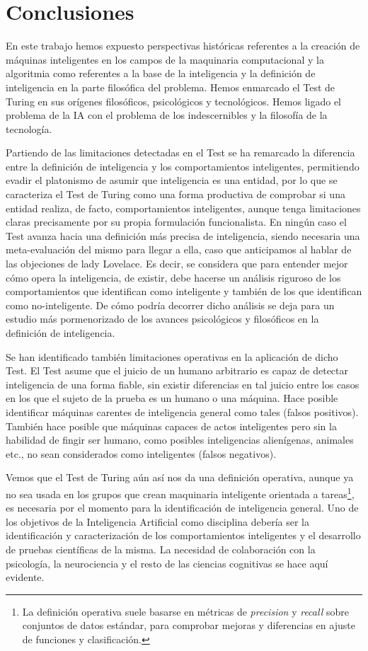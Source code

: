 \documentclass[12pt]{memoir}
\begin{document}
\chapter{Conclusiones}

En este trabajo hemos expuesto perspectivas históricas referentes a la creación de máquinas inteligentes en los campos de la maquinaria computacional y la algoritmia como referentes a la base de la inteligencia y la definición de inteligencia en la parte filosófica del problema. Hemos enmarcado el Test de Turing en sus orígenes filosóficos, psicológicos y tecnológicos. Hemos ligado el problema de la IA con el problema de los indescernibles y la filosofía de la tecnología.

Partiendo de las limitaciones detectadas en el Test se ha remarcado la diferencia entre la definición de inteligencia y los comportamientos inteligentes, permitiendo evadir el platonismo de asumir que inteligencia es una entidad, por lo que se caracteriza el Test de Turing como una forma productiva de comprobar si una entidad realiza, de facto, comportamientos inteligentes, aunque tenga limitaciones claras precisamente por su propia formulación funcionalista. En ningún caso el Test avanza hacia una definición más precisa de inteligencia, siendo necesaria una meta-evaluación del mismo para llegar a ella, caso que anticipamos al hablar de las objeciones de lady Lovelace. Es decir, se considera que para entender mejor cómo opera la inteligencia, de existir, debe hacerse un análisis riguroso de los comportamientos que identifican como inteligente y también de los que identifican como no-inteligente. De cómo podría decorrer dicho análisis se deja para un estudio más pormenorizado de los avances psicológicos y filosóficos en la definición de inteligencia.

Se han identificado también limitaciones operativas en la aplicación de dicho Test. El Test asume que el juicio de un humano arbitrario es capaz de detectar inteligencia de una forma fiable, sin existir diferencias en tal juicio entre los casos en los que el sujeto de la prueba es un humano o una máquina. Hace posible identificar máquinas carentes de inteligencia general como tales (falsos positivos). También hace posible que máquinas capaces de actos inteligentes pero sin la habilidad de fingir ser humano, como posibles inteligencias alienígenas, animales etc., no sean considerados como inteligentes (falsos negativos).

Vemos que el Test de Turing aún así nos da una definición operativa, aunque ya no sea usada en los grupos que crean maquinaria inteligente orientada a tareas\footnote{La definición operativa suele basarse en métricas de \textit{precision} y \textit{recall} sobre conjuntos de datos estándar, para comprobar mejoras y diferencias en ajuste de funciones y clasificación.}, es necesaria por el momento para la identificación de inteligencia general. Uno de los objetivos de la Inteligencia Artificial como disciplina debería ser la identificación y caracterización de los comportamientos inteligentes y el desarrollo de pruebas científicas de la misma. La necesidad de colaboración con la psicología, la neurociencia y el resto de las ciencias cognitivas se hace aquí evidente.
\end{document}
